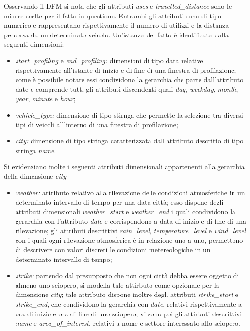 Osservando il DFM si nota che gli attributi \textit{uses} e \textit{travelled\_distance}
sono le misure scelte per il fatto in questione. Entrambi gli attributi sono di tipo numerico e
rappresentano rispettivamente il numero di utilizzi e la distanza percorsa da un determinato
veicolo.
Un'istanza del fatto è identificata dalla seguenti dimensioni:
\begin{itemize}
\item \textit{start\_profiling} e \textit{end\_profiling:} dimensioni di tipo data relative
rispettivamente all'istante di inizio e di fine di una finestra di profilazione; come è possibile
notare essi condividono la gerarchia che parte dall'attributo date e comprende tutti gli 
attributi discendenti quali \textit{day}, \textit{weekday}, \textit{month}, \textit{year},
\textit{minute} e \textit{hour};
\item \textit{vehicle\_type:} dimensione di tipo stirnga che permette la selezione tra diversi
tipi di veicoli all'interno di una finestra di profilazione;
\item \textit{city:} dimensione di tipo stringa caratterizzata dall'attributo descritto di tipo
stringa \textit{name}.
\end{itemize}
Si evidenziano inolte i seguenti attributi dimensionali appartenenti alla gerarchia della
dimensione \textit{city}:
\begin{itemize}
\item \textit{weather:} attributo relativo alla rilevazione delle condizioni atmosferiche
in un determinato intervallo di tempo per una data città; esso dispone degli attributi
dimensionali \textit{weather\_start} e \textit{weather\_end} i quali condividono la gerarchia
con l'attributo \textit{date} e corrispondono a data di inizio e di fine di una rilevazione;
gli attributi descrittivi \textit{rain\_level}, \textit{temperature\_level} e
\textit{wind\_level} con i quali ogni rilevazione atmosferica è in relazione uno a uno,
permettono di descrivere con valori discreti le condizioni metereologiche in un determinato
intervallo di tempo;
\item \textit{strike:} partendo dal presupposto che non ogni città debba essere oggetto di
almeno uno sciopero, si modella tale attirbuto come opzionale per la dimensione \textit{city};
tale attributo dispone inoltre degli attributi \textit{strike\_start} e \textit{strike\_end},
che condividono la gerarchia con \textit{date}, relativi rispettivamente a 
ora di inizio e ora di fine di uno sciopero; vi sono poi gli attirbuti descrittivi \textit{name} e 
\textit{area\_of\_interest}, relativi a nome e settore interessato allo sciopero.
\end{itemize}


